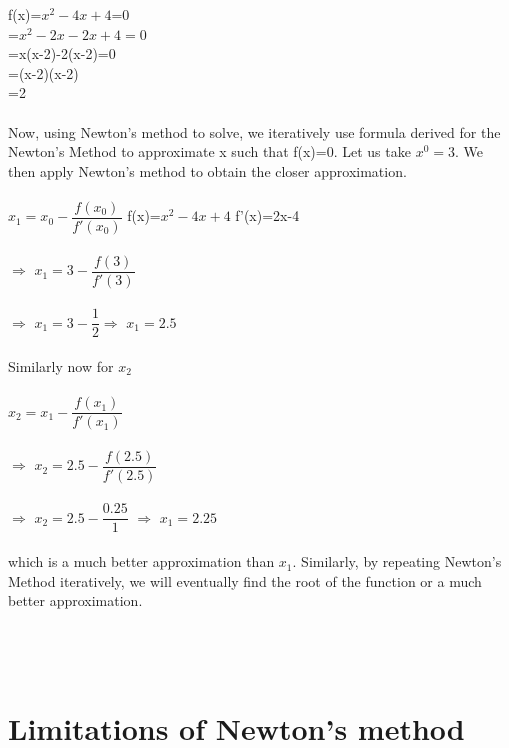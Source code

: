 \documentclass[15pt]{report}
\begin{document}
{\large f(x)=$x^{2}-4x+4$=0\\
\hspace*{6mm}=$x^{2}-2x-2x+4=0$\\
\hspace*{6mm}=x(x-2)-2(x-2)=0\\
\hspace*{6mm}=(x-2)(x-2)\\
\hspace*{6mm}=2}\\ \\
Now, using Newton’s method to solve, we iteratively use formula derived for the Newton's Method to approximate x such that f(x)=0. Let us take $x^{0}=3$. We then apply Newton's method to obtain the closer approximation.\\ \\
{\large $x_{1}=x_{0}-\dfrac{f(x_{0})}{f'(x_{0})}$ \hspace*{20 mm} f(x)=$x^{2}-4x+4$ \hspace*{20mm}  f'(x)=2x-4}\\ \\
$\Rightarrow$ {\large $x_{1}=3-\dfrac{f(3)}{f'(3)}$} \\ \\
$\Rightarrow$ {\large $x_{1}=3-\dfrac{1}{2}$}\hspace*{20mm}$\Rightarrow$ {\large $x_{1}=2.5$}\\ \\
Similarly now for $x_{2}$ \\ \\
{\large $x_{2}=x_{1}-\dfrac{f(x_{1})}{f'(x_{1})}$}\\ \\
$\Rightarrow$ {\large $x_{2}=2.5-\dfrac{f(2.5)}{f'(2.5)}$} \\ \\
$\Rightarrow$ {\large $x_{2}=2.5-\dfrac{0.25}{1}$} \hspace*{20mm} $\Rightarrow$ {\large $x_{1}=2.25$}\\ \\
which is a much better approximation than $x_{1}$. Similarly, by repeating Newton's Method iteratively, we will eventually find the root of the function or a much better approximation.\\ \\ \\ \\
\newpage
\section*{Limitations of Newton's method}
\end{document}
